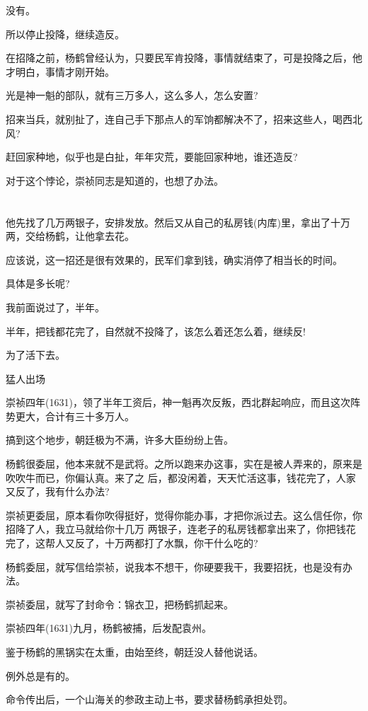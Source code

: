 \documentclass[11pt,a4paper,onecolumn]{article}
\begin{document}
没有。

所以停止投降，继续造反。

在招降之前，杨鹤曾经认为，只要民军肯投降，事情就结束了，可是投降之后，他才明白，事情才刚开始。

光是神一魁的部队，就有三万多人，这么多人，怎么安置?

招来当兵，就别扯了，连自己手下那点人的军饷都解决不了，招来这些人，喝西北风?

赶回家种地，似乎也是白扯，年年灾荒，要能回家种地，谁还造反?

对于这个悖论，崇祯同志是知道的，也想了办法。

\section[\thesection]{}

他先找了几万两银子，安排发放。然后又从自己的私房钱(内库)里，拿出了十万两，交给杨鹤，让他拿去花。

应该说，这一招还是很有效果的，民军们拿到钱，确实消停了相当长的时间。

具体是多长呢?

我前面说过了，半年。

半年，把钱都花完了，自然就不投降了，该怎么着还怎么着，继续反!

为了活下去。

猛人出场

崇祯四年(1631)，领了半年工资后，神一魁再次反叛，西北群起响应，而且这次阵势更大，合计有三十多万人。

搞到这个地步，朝廷极为不满，许多大臣纷纷上告。

杨鹤很委屈，他本来就不是武将。之所以跑来办这事，实在是被人弄来的，原来是吹吹牛而已，你偏认真。来了之
后，都没闲着，天天忙活这事，钱花完了，人家又反了，我有什么办法?

崇祯更委屈，原本看你吹得挺好，觉得你能办事，才把你派过去。这么信任你，你招降了人，我立马就给你十几万
两银子，连老子的私房钱都拿出来了，你把钱花完了，这帮人又反了，十万两都打了水飘，你干什么吃的?

杨鹤委屈，就写信给崇祯，说我本不想干，你硬要我干，我要招抚，也是没有办法。

崇祯委屈，就写了封命令：锦衣卫，把杨鹤抓起来。

崇祯四年(1631)九月，杨鹤被捕，后发配袁州。

鉴于杨鹤的黑锅实在太重，由始至终，朝廷没人替他说话。

例外总是有的。

命令传出后，一个山海关的参政主动上书，要求替杨鹤承担处罚。
\end{document}
